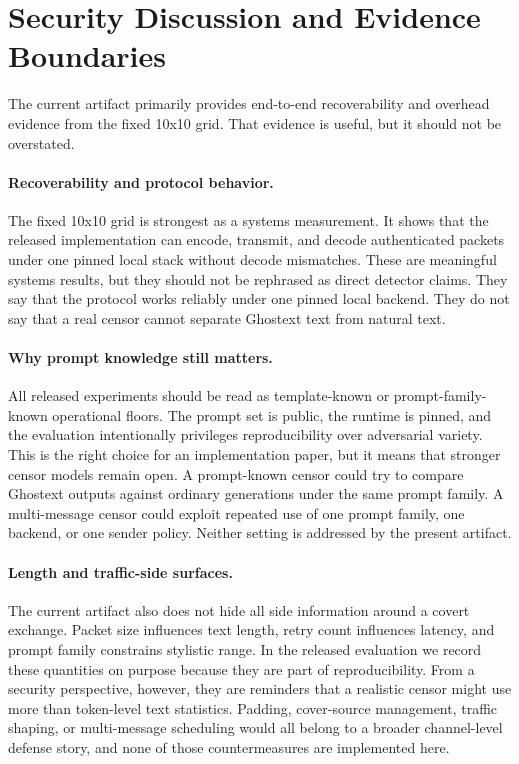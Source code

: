 \section{Security Discussion and Evidence Boundaries}

The current artifact primarily provides end-to-end recoverability and overhead evidence from the fixed 10x10 grid. That evidence is useful, but it should not be overstated.

\paragraph{Recoverability and protocol behavior.} The fixed 10x10 grid is strongest as a systems measurement. It shows that the released implementation can encode, transmit, and decode authenticated packets under one pinned local stack without decode mismatches. These are meaningful systems results, but they should not be rephrased as direct detector claims. They say that the protocol works reliably under one pinned local backend. They do not say that a real censor cannot separate Ghostext text from natural text.

\paragraph{Why prompt knowledge still matters.} All released experiments should be read as template-known or prompt-family-known operational floors. The prompt set is public, the runtime is pinned, and the evaluation intentionally privileges reproducibility over adversarial variety. This is the right choice for an implementation paper, but it means that stronger censor models remain open. A prompt-known censor could try to compare Ghostext outputs against ordinary generations under the same prompt family. A multi-message censor could exploit repeated use of one prompt family, one backend, or one sender policy. Neither setting is addressed by the present artifact.

\paragraph{Length and traffic-side surfaces.} The current artifact also does not hide all side information around a covert exchange. Packet size influences text length, retry count influences latency, and prompt family constrains stylistic range. In the released evaluation we record these quantities on purpose because they are part of reproducibility. From a security perspective, however, they are reminders that a realistic censor might use more than token-level text statistics. Padding, cover-source management, traffic shaping, or multi-message scheduling would all belong to a broader channel-level defense story, and none of those countermeasures are implemented here.

